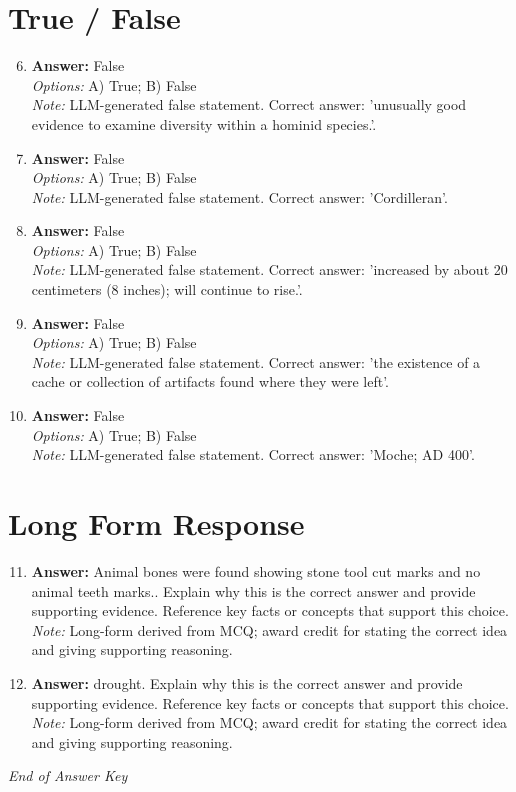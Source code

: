 \documentclass[12pt]{article}
\begin{document}
\section*{True / False}
\begin{enumerate}[label=\arabic*.]
\setcounter{enumi}{5}
\item \textbf{Answer:} False
\\ \textit{Options:} A) True; B) False
\\ \textit{Note:} LLM-generated false statement. Correct answer: 'unusually good evidence to examine diversity within a hominid species.'.
\item \textbf{Answer:} False
\\ \textit{Options:} A) True; B) False
\\ \textit{Note:} LLM-generated false statement. Correct answer: 'Cordilleran'.
\item \textbf{Answer:} False
\\ \textit{Options:} A) True; B) False
\\ \textit{Note:} LLM-generated false statement. Correct answer: 'increased by about 20 centimeters (8 inches); will continue to rise.'.
\item \textbf{Answer:} False
\\ \textit{Options:} A) True; B) False
\\ \textit{Note:} LLM-generated false statement. Correct answer: 'the existence of a cache or collection of artifacts found where they were left'.
\item \textbf{Answer:} False
\\ \textit{Options:} A) True; B) False
\\ \textit{Note:} LLM-generated false statement. Correct answer: 'Moche; AD 400'.
\end{enumerate}

\section*{Long Form Response}
\begin{enumerate}[label=\arabic*.]
\setcounter{enumi}{10}
\item \textbf{Answer:} Animal bones were found showing stone tool cut marks and no animal teeth marks.. Explain why this is the correct answer and provide supporting evidence. Reference key facts or concepts that support this choice.
\\ \textit{Note:} Long-form derived from MCQ; award credit for stating the correct idea and giving supporting reasoning.
\item \textbf{Answer:} drought. Explain why this is the correct answer and provide supporting evidence. Reference key facts or concepts that support this choice.
\\ \textit{Note:} Long-form derived from MCQ; award credit for stating the correct idea and giving supporting reasoning.
\end{enumerate}

\vfill
\noindent\textit{End of Answer Key}
\end{document}

